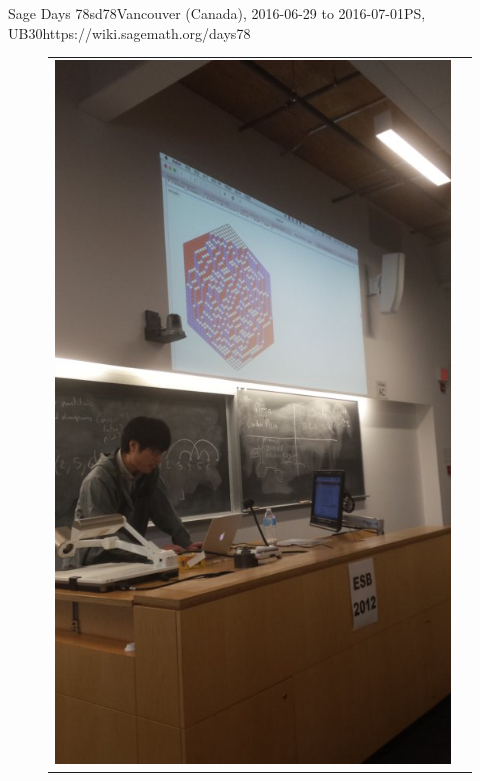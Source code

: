 \begin{event}{Sage Days 78}{sd78}{Vancouver (Canada), 2016-06-29 to 2016-07-01}{PS, UB}{30}{https://wiki.sagemath.org/days78}
\begin{figure}[ht]
\begin{tabular}{cc}
\includegraphics[scale=0.3]{pictures/sd78-2.jpg}
\end{tabular}
\end{figure}



\end{event}